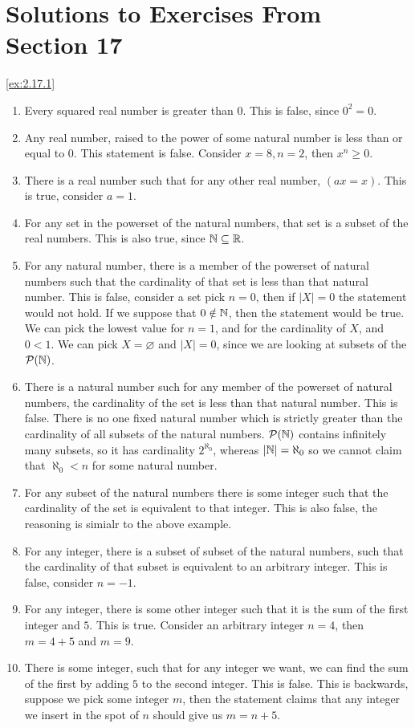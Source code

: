 \section*{Solutions to Exercises From Section 17}
\begin{solution}\label{sol:2.17.1}\ref{ex:2.17.1}
    \begin{enumerate}
        \item Every squared real number is greater than $0$. This is false, since $0^{2}=0$.
        \item Any real number, raised to the power of some natural number is less than or equal to $0$. This statement is false. Consider $x=8,n=2$, then $x^{n}\ge 0$. 
        \item There is a real number such that for any other real number, $(ax=x)$. This is true, consider $a=1$.
        \item For any set in the powerset of the natural numbers, that set is a subset of the real numbers. This is also true, since $\mathbb{N}\subseteq\mathbb{R}$. 
        \item For any natural number, there is a member of the powerset of natural numbers such that the cardinality of that set is less than that natural number. This is false, consider a set pick $n=0$, then if $\lvert X \rvert=0$ the statement would not hold. If we suppose that $0\notin\mathbb{N}$, then the statement would be true. We can pick the lowest value for $n=1$, and for the cardinality of $X$, and $0<1$. We can pick $X=\varnothing$ and $\lvert X \rvert=0$, since we are looking at subsets of the $\mathcal{P}(\mathbb{N})$.  
        \item There is a natural number such for any member of the powerset of natural numbers, the cardinality of the set is less than that natural number. This is false. There is no one fixed natural number which is strictly greater than the cardinality of all subsets of the natural numbers. $\mathcal{P}(\mathbb{N})$ contains infinitely many subsets, so it has cardinality $2^{\aleph_{0}}$, whereas $\lvert \mathbb{N} \rvert=\aleph_0$ so we cannot claim that $\aleph_{0}<n$ for some natural number. 
        \item For any subset of the natural numbers there is some integer such that the cardinality of the set is equivalent to that integer. This is also false, the reasoning is simialr to the above example. 
        \item For any integer, there is a subset of subset of the natural numbers, such that the cardinality of that subset is equivalent to an arbitrary integer. This is false, consider $n=-1$. 
        \item For any integer, there is some other integer such that it is the sum of the first integer and $5$. This is true. Consider an arbitrary integer $n=4$, then $m=4+5$ and $m=9$. 
        \item There is some integer, such that for any integer we want, we can find the sum of the first by adding $5$ to the second integer. This is false. This is backwards, suppose we pick some integer $m$, then the statement claims that any integer we insert in the spot of $n$ should give us $m=n+5$. 
    \end{enumerate}
\end{solution}